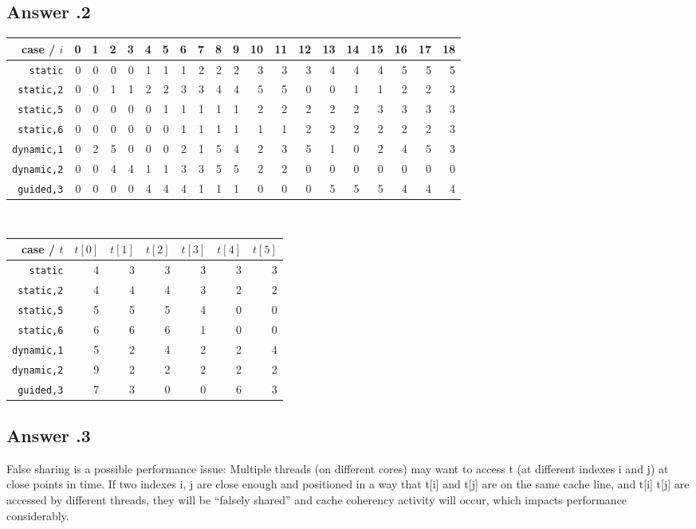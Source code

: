 \documentclass[a4paper,%
11pt,%
DIV=12,
headsepline,%
headings=normal,
]{scrartcl}
\newcounter{curex}
\newcommand{\answer}[1]{\subsection*{Answer \arabic{curex}.#1}}
\begin{document}
\answer{2}


\begin{tabular}{rrrrrrrrrrrrrrrrrrrr}
  \toprule
 case /  $i$ & 0 & 1 & 2 & 3 & 4 & 5 & 6 & 7 & 8 & 9 & 10 & 11 & 12 & 13 & 14 & 15 & 16 & 17 & 18  \\
  \midrule
\texttt{static}     & 0 & 0 & 0 & 0 & 1 & 1 & 1 & 2 & 2 & 2 & 3 & 3 & 3 & 4 & 4 & 4 & 5 & 5 & 5 \\
\texttt{static,2}   & 0 & 0 & 1 & 1 & 2 & 2 & 3 & 3 & 4 & 4 & 5 & 5 & 0 & 0 & 1 & 1 & 2 & 2 & 3 \\
\texttt{static,5}   & 0 & 0 & 0 & 0 & 0 & 1 & 1 & 1 & 1 & 1 & 2 & 2 & 2 & 2 & 2 & 3 & 3 & 3 & 3 \\
\texttt{static,6}   & 0 & 0 & 0 & 0 & 0 & 0 & 1 & 1 & 1 & 1 & 1 & 1 & 2 & 2 & 2 & 2 & 2 & 2 & 3 \\ 
\texttt{dynamic,1}  & 0 & 2 & 5 & 0 & 0 & 0 & 2 & 1 & 5 & 4 & 2 & 3 & 5 & 1 & 0 & 2 & 4 & 5 & 3 \\
\texttt{dynamic,2}  & 0 & 0 & 4 & 4 & 1 & 1 & 3 & 3 & 5 & 5 & 2 & 2 & 0 & 0 & 0 & 0 & 0 & 0 & 0 \\
  \texttt{guided,3} & 0 & 0 & 0 & 0 & 4 & 4 & 4 & 1 & 1 & 1 & 0 & 0 & 0 & 5 & 5 & 5 & 4 & 4 & 4 \\
  \bottomrule
\end{tabular}\\

\begin{tabular}{rrrrrrr}
  \toprule
case / $t$             & $t[0]$ & $t[1]$ & $t[2]$ & $t[3]$ & $t[4]$ & $t[5]$ \\  
  \midrule
\texttt{static}    & 4 & 3 & 3 & 3 & 3 & 3 \\
\texttt{static,2}  & 4 & 4 & 4 & 3 & 2 & 2 \\
\texttt{static,5}  & 5 & 5 & 5 & 4 & 0 & 0 \\
\texttt{static,6}  & 6 & 6 & 6 & 1 & 0 & 0 \\
\texttt{dynamic,1} & 5 & 2 & 4 & 2 & 2 & 4 \\
\texttt{dynamic,2} & 9 & 2 & 2 & 2 & 2 & 2 \\
\texttt{guided,3}  & 7 & 3 & 0 & 0 & 6 & 3 \\
    \bottomrule
\end{tabular}

\answer{3}
False sharing is a possible performance issue:
Multiple threads (on different cores) may want to access t (at different indexes i and j) at close points in time. If two indexes i, j are close enough and positioned in a way that t[i] and t[j] are on the same cache line, and t[i] t[j] are accessed by different threads, they will be ``falsely shared'' and cache coherency activity will occur, which impacts performance considerably. 
\end{document}
